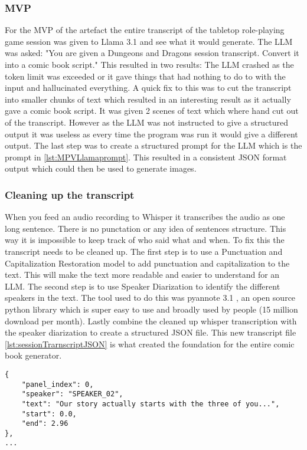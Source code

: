\subsubsection{MVP}
For the MVP of the artefact the entire transcript of the tabletop role-playing game session was given to Llama 3.1 and see what it would generate. The LLM was asked: "You are given a Dungeons and Dragons session transcript. Convert it into a comic book script." This resulted in two results: The LLM crashed as the token limit was exceeded or it gave things that had nothing to do to with the input and hallucinated everything. A quick fix to this was to cut the transcript into smaller chunks of text which resulted in an interesting result as it actually gave a comic book script. It was given 2 scenes of text which where hand cut out of the transcript. However as the LLM was not instructed to give a structured output it was useless as every time the program was run it would give a different output. The last step was to create a structured prompt for the LLM which is the prompt in \ref{lst:MPVLlamaprompt}. This resulted in a consistent JSON format output which could then be used to generate images.

\subsubsection{Cleaning up the transcript}
When you feed an audio recording to Whisper it transcribes the audio as one long sentence. There is no punctation or any idea of sentences structure. This way it is impossible to keep track of who said what and when. To fix this the transcript needs to be cleaned up. The first step is to use a Punctuation and Capitalization Restoration model \cite{guhr-EtAl:2021:fullstop} to add punctuation and capitalization to the text. This will make the text more readable and easier to understand for an LLM. The second step is to use Speaker Diarization to identify the different speakers in the text. The tool used to do this was pyannote 3.1 \cite{Bredin23,Plaquet23}, an open source python library which is super easy to use and broadly used by people (15 million download per month). Lastly combine the cleaned up whisper transcription with the speaker diarization to create a structured JSON file. This new transcript file \ref{lst:sessionTrarnscriptJSON} is what created the foundation for the entire comic book generator.

\begin{lstlisting}[style=jsonstyle, caption={Session transcript JSON}, label={lst:sessionTrarnscriptJSON}]
{
    "panel_index": 0,
    "speaker": "SPEAKER_02",
    "text": "Our story actually starts with the three of you...",
    "start": 0.0,
    "end": 2.96
},
...
\end{lstlisting}

